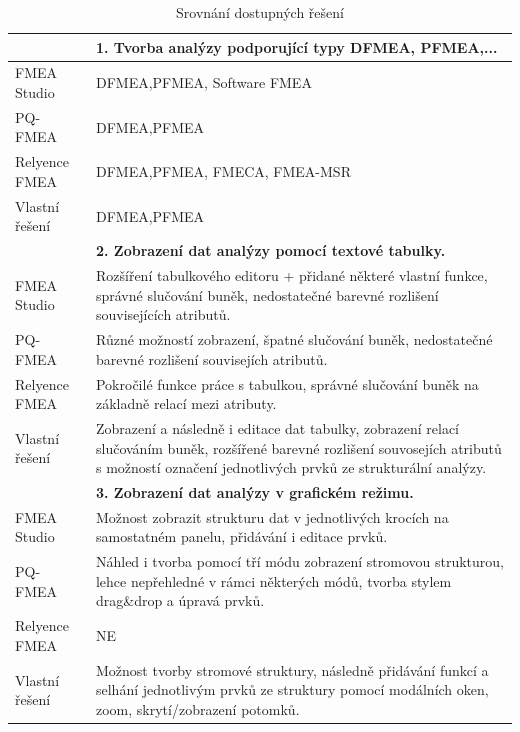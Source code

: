 \begin{longtable}{|p{4cm} | p{12cm} |} 
        \caption{Srovnání dostupných řešení}
\label{tab:compare}
         \hline
& \textbf{1. Tvorba analýzy podporující typy DFMEA, PFMEA,...} \\ \hline
 FMEA Studio &	DFMEA,PFMEA, Software FMEA  \\ 
 PQ-FMEA &	 DFMEA,PFMEA  \\ 
 Relyence FMEA &	 DFMEA,PFMEA, FMECA, FMEA-MSR  \\ 
Vlastní řešení &	 DFMEA,PFMEA \\ \hline

& \textbf{2. Zobrazení dat analýzy pomocí textové tabulky.}  \\ \hline
 FMEA Studio &	Rozšíření tabulkového editoru + přidané některé vlastní funkce, správné slučování buněk, nedostatečné barevné rozlišení souvisejících atributů.  \\ 
 PQ-FMEA &	 Různé možností zobrazení, špatné slučování buněk, nedostatečné barevné rozlišení souvisejích atributů.  \\ 
 Relyence FMEA &	 Pokročilé funkce práce s tabulkou, správné slučování buněk na základně relací mezi atributy.  \\ 
Vlastní řešení &	 Zobrazení a následně i editace dat tabulky, zobrazení relací slučováním buněk, rozšířené barevné rozlišení souvosejích atributů s možností označení jednotlivých prvků ze strukturální analýzy. \\ \hline

& \textbf{3. Zobrazení dat analýzy v grafickém režimu.} \\ \hline
 FMEA Studio &	 Možnost zobrazit strukturu dat v jednotlivých krocích na samostatném panelu, přidávání i editace prvků.\\ 
 PQ-FMEA & Náhled i tvorba pomocí tří módu zobrazení stromovou strukturou, lehce nepřehledné v rámci některých módů, tvorba stylem drag\&drop a úpravá prvků.  \\ 
 Relyence FMEA &	 NE  \\ 
Vlastní řešení &	 Možnost tvorby stromové struktury, následně přidávání funkcí a selhání jednotlivým prvků ze struktury pomocí modálních oken, zoom, skrytí/zobrazení potomků. \\ \hline


\end{longtable}
